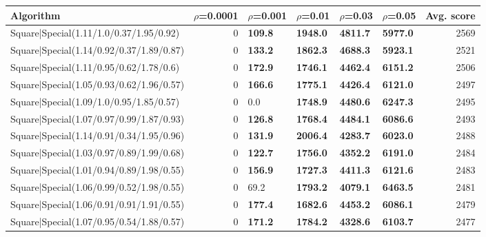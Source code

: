 \begin{tabular}{lrllllr}
\hline
 Algorithm                                                     &   $\rho$=0.0001 & $\rho$=0.001   & $\rho$=0.01     & $\rho$=0.03     & $\rho$=0.05     &   Avg. score \\
\hline
 Square|Special(1.11/1.0/0.37/1.95/0.92)                       &             0   & \textbf{109.8} & \textbf{1948.0} & \textbf{4811.7} & \textbf{5977.0} &         2569 \\
 Square|Special(1.14/0.92/0.37/1.89/0.87)                      &             0   & \textbf{133.2} & \textbf{1862.3} & \textbf{4688.3} & \textbf{5923.1} &         2521 \\
 Square|Special(1.11/0.95/0.62/1.78/0.6)                       &             0   & \textbf{172.9} & \textbf{1746.1} & \textbf{4462.4} & \textbf{6151.2} &         2506 \\
 Square|Special(1.05/0.93/0.62/1.96/0.57)                      &             0   & \textbf{166.6} & \textbf{1775.1} & \textbf{4426.4} & \textbf{6121.0} &         2497 \\
 Square|Special(1.09/1.0/0.95/1.85/0.57)                       &             0   & 0.0            & \textbf{1748.9} & \textbf{4480.6} & \textbf{6247.3} &         2495 \\
 Square|Special(1.07/0.97/0.99/1.87/0.93)                      &             0   & \textbf{126.8} & \textbf{1768.4} & \textbf{4484.1} & \textbf{6086.6} &         2493 \\
 Square|Special(1.14/0.91/0.34/1.95/0.96)                      &             0   & \textbf{131.9} & \textbf{2006.4} & \textbf{4283.7} & \textbf{6023.0} &         2488 \\
 Square|Special(1.03/0.97/0.89/1.99/0.68)                      &             0   & \textbf{122.7} & \textbf{1756.0} & \textbf{4352.2} & \textbf{6191.0} &         2484 \\
 Square|Special(1.01/0.94/0.89/1.98/0.55)                      &             0   & \textbf{156.9} & \textbf{1727.3} & \textbf{4411.3} & \textbf{6121.6} &         2483 \\
 Square|Special(1.06/0.99/0.52/1.98/0.55)                      &             0   & 69.2           & \textbf{1793.2} & \textbf{4079.1} & \textbf{6463.5} &         2481 \\
 Square|Special(1.06/0.91/0.91/1.91/0.55)                      &             0   & \textbf{177.4} & \textbf{1682.6} & \textbf{4453.2} & \textbf{6086.1} &         2479 \\
 Square|Special(1.07/0.95/0.54/1.88/0.57)                      &             0   & \textbf{171.2} & \textbf{1784.2} & \textbf{4328.6} & \textbf{6103.7} &         2477 \\

\end{tabular}
